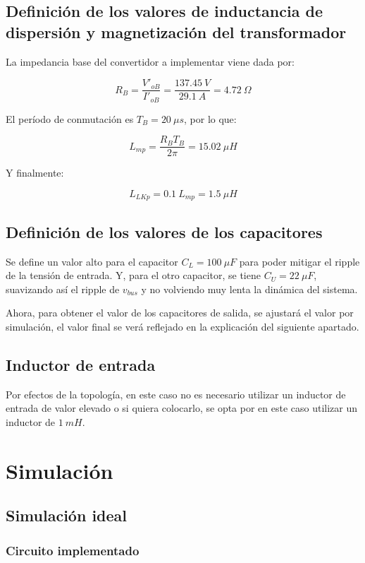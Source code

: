 \subsection{Definición de los valores de inductancia de dispersión y magnetización del transformador}

La impedancia base del convertidor a implementar viene dada por:

$$
R_B = \frac{V'_{oB}}{I'_{oB}}=\frac{137.45 \ V}{29.1 \ A}=4.72 \ \Omega
$$

El período de conmutación es $T_B=20 \ \mu s$, por lo que:

$$
L_{mp}=\frac{R_B T_B}{2 \pi}=15.02 \ \mu H
$$

Y finalmente:

$$
L_{LKp} = 0.1 \ L_{mp} = 1.5 \ \mu H
$$

\subsection{Definición de los valores de los capacitores}

Se define un valor alto para el capacitor $C_L=100 \ \mu F$ para poder mitigar el ripple de la tensión de entrada. Y, para el otro capacitor, se tiene $C_U=22 \ \mu F$, suavizando así el ripple de $v_{bus}$ y no volviendo muy lenta la dinámica del sistema. 

Ahora, para obtener el valor de los capacitores de salida, se ajustará el valor por simulación, el valor final se verá reflejado en la explicación del siguiente apartado.


\subsection{Inductor de entrada}

Por efectos de la topología, en este caso no es necesario utilizar un inductor de entrada de valor elevado o si quiera colocarlo, se opta por en este caso utilizar un inductor de $1 \ mH$.


\clearpage


\section{Simulación}

\subsection{Simulación ideal}

\subsubsection{Circuito implementado}

